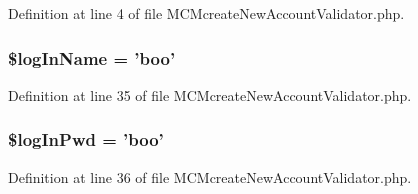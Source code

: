 Definition at line 4 of file M\-C\-Mcreate\-New\-Account\-Validator.\-php.

\hypertarget{_m_c_mcreate_new_account_validator_8php_a30b110afa9d5bd2d01ba8f74a46d2b3f}{
\subsubsection[{\$log\-In\-Name}]{\setlength{\rightskip}{0pt plus 5cm}\$log\-In\-Name = 'boo'}}\label{_m_c_mcreate_new_account_validator_8php_a30b110afa9d5bd2d01ba8f74a46d2b3f}


Definition at line 35 of file M\-C\-Mcreate\-New\-Account\-Validator.\-php.

\hypertarget{_m_c_mcreate_new_account_validator_8php_a1c091e7fa854daecefe6889e0cb8975e}{
\subsubsection[{\$log\-In\-Pwd}]{\setlength{\rightskip}{0pt plus 5cm}\$log\-In\-Pwd = 'boo'}}\label{_m_c_mcreate_new_account_validator_8php_a1c091e7fa854daecefe6889e0cb8975e}


Definition at line 36 of file M\-C\-Mcreate\-New\-Account\-Validator.\-php.

